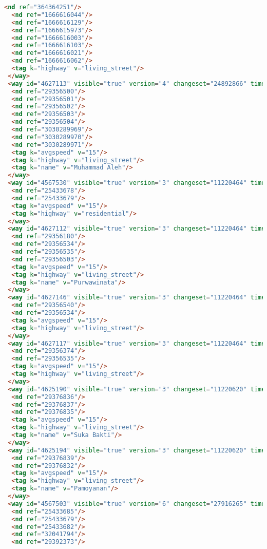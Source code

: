 \begin{lstlisting}[language=HTML,basicstyle=\tiny,caption=bandung1.xml]
  <nd ref="364364251"/>
  <nd ref="1666616044"/>
  <nd ref="1666616129"/>
  <nd ref="1666615973"/>
  <nd ref="1666616003"/>
  <nd ref="1666616103"/>
  <nd ref="1666616021"/>
  <nd ref="1666616062"/>
  <tag k="highway" v="living_street"/>
 </way>
 <way id="4627113" visible="true" version="4" changeset="24892866" timestamp="2014-08-20T18:40:32Z" user="albahrimaraxsa" uid="2162153">
  <nd ref="29356500"/>
  <nd ref="29356501"/>
  <nd ref="29356502"/>
  <nd ref="29356503"/>
  <nd ref="29356504"/>
  <nd ref="3030289969"/>
  <nd ref="3030289970"/>
  <nd ref="3030289971"/>
  <tag k="avgspeed" v="15"/>
  <tag k="highway" v="living_street"/>
  <tag k="name" v="Muhammad Aleh"/>
 </way>
 <way id="4567530" visible="true" version="3" changeset="11220464" timestamp="2012-04-08T02:49:10Z" user="andryono" uid="643030">
  <nd ref="25433678"/>
  <nd ref="25433679"/>
  <tag k="avgspeed" v="15"/>
  <tag k="highway" v="residential"/>
 </way>
 <way id="4627112" visible="true" version="3" changeset="11220464" timestamp="2012-04-08T02:49:12Z" user="andryono" uid="643030">
  <nd ref="29356180"/>
  <nd ref="29356534"/>
  <nd ref="29356535"/>
  <nd ref="29356503"/>
  <tag k="avgspeed" v="15"/>
  <tag k="highway" v="living_street"/>
  <tag k="name" v="Purwawinata"/>
 </way>
 <way id="4627146" visible="true" version="3" changeset="11220464" timestamp="2012-04-08T02:49:12Z" user="andryono" uid="643030">
  <nd ref="29356540"/>
  <nd ref="29356534"/>
  <tag k="avgspeed" v="15"/>
  <tag k="highway" v="living_street"/>
 </way>
 <way id="4627117" visible="true" version="3" changeset="11220464" timestamp="2012-04-08T02:49:13Z" user="andryono" uid="643030">
  <nd ref="29356374"/>
  <nd ref="29356535"/>
  <tag k="avgspeed" v="15"/>
  <tag k="highway" v="living_street"/>
 </way>
 <way id="4625190" visible="true" version="3" changeset="11220620" timestamp="2012-04-08T04:00:41Z" user="andryono" uid="643030">
  <nd ref="29376836"/>
  <nd ref="29376837"/>
  <nd ref="29376835"/>
  <tag k="avgspeed" v="15"/>
  <tag k="highway" v="living_street"/>
  <tag k="name" v="Suka Bakti"/>
 </way>
 <way id="4625194" visible="true" version="3" changeset="11220620" timestamp="2012-04-08T04:00:42Z" user="andryono" uid="643030">
  <nd ref="29376839"/>
  <nd ref="29376832"/>
  <tag k="avgspeed" v="15"/>
  <tag k="highway" v="living_street"/>
  <tag k="name" v="Pamoyanan"/>
 </way>
 <way id="4567503" visible="true" version="6" changeset="27916265" timestamp="2015-01-04T18:11:06Z" user="isonpurba" uid="2552445">
  <nd ref="25433685"/>
  <nd ref="25433679"/>
  <nd ref="25433682"/>
  <nd ref="32041794"/>
  <nd ref="29392373"/>

\end{lstlisting}
